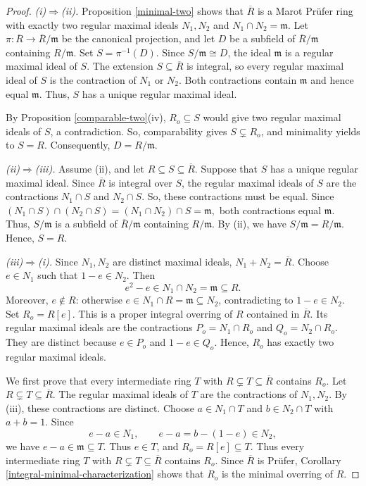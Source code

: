 \documentclass[12pt]{article}
\begin{document}
	\begin{proof}
		\emph{(i)$\Rightarrow$(ii).}
		Proposition \ref{minimal-two} shows that $\overline R$ is a Marot Prüfer ring with exactly two regular maximal ideals $N_1,N_2$ and $N_1\cap N_2=\mathfrak{m}$. Let $\pi:\overline R\to\overline R/\mathfrak{m}$ be the canonical projection, and let $D$ be a subfield of $\overline R/\mathfrak{m}$ containing $R/\mathfrak{m}$. Set $S=\pi^{-1}(D)$. Since $S/\mathfrak{m}\cong D$, the ideal $\mathfrak{m}$ is a regular maximal ideal of $S$. The extension $S\subseteq\overline R$ is integral, so every regular maximal ideal of $S$ is the contraction of $N_1$ or $N_2$. Both contractions contain $\mathfrak{m}$ and hence equal $\mathfrak{m}$. Thus, $S$ has a unique regular maximal ideal.
		
		By Proposition \ref{comparable-two}(iv), $R_o\subseteq S$ would give two regular maximal ideals of $S$, a contradiction. So, comparability gives $S\subsetneq R_o$, and minimality yields to $S=R$. Consequently, $D=R/\mathfrak{m}$.
		
		\emph{(ii)$\Rightarrow$(iii).} Assume (ii), and let $R\subseteq S\subseteq\overline R$. Suppose that $S$ has a unique regular maximal ideal. Since $\overline R$ is integral over $S$, the regular maximal ideals of $S$ are the contractions $N_1\cap S$ and $N_2\cap S$. So, these contractions must be equal. Since $ (N_1\cap S)\cap(N_2\cap S) =(N_1\cap N_2)\cap S=\mathfrak{m}, $ both contractions equal $\mathfrak{m}$. Thus, $S/\mathfrak{m}$ is a subfield of $\overline R/\mathfrak{m}$ containing $R/\mathfrak{m}$. By (ii), we have $S/\mathfrak{m}=R/\mathfrak{m}$. Hence, $S=R$.
		
		\emph{(iii)$\Rightarrow$(i).}
		Since $N_1,N_2$ are distinct maximal ideals, $N_1+N_2=\overline R$. Choose $e\in N_1$ such that $1-e\in N_2$. Then
		\[
		e^2-e\in N_1\cap N_2=\mathfrak{m}\subseteq R.
		\]
		Moreover, $e\notin R$: otherwise $e\in N_1\cap R=\mathfrak{m}\subseteq N_2$, contradicting to $1-e\in N_2$. Set $R_o=R[e]$. This is a proper integral overring of $R$ contained in $\overline R$. Its regular maximal ideals are the contractions $P_o=N_1\cap R_o$ and $Q_o=N_2\cap R_o$. They are distinct because $e\in P_o$ and $1-e\in Q_o$. Hence, $R_o$ has exactly two regular maximal ideals.
		
		We first prove that every intermediate ring $T$ with $R\subsetneq T\subseteq\overline R$ contains $R_o$. Let $R\subsetneq T\subseteq\overline R$. The regular maximal ideals of $T$ are the contractions of $N_1,N_2$. By (iii), these contractions are distinct. Choose $a\in N_1\cap T$ and $b\in N_2\cap T$ with $a+b=1$. Since
		\[
		e-a\in N_1,\qquad e-a=b-(1-e)\in N_2,
		\]
		we have $e-a\in\mathfrak{m}\subseteq T$. Thus $e\in T$, and $R_o=R[e]\subseteq T$. Thus every intermediate ring $T$ with $R\subsetneq T\subseteq\overline R$ contains $R_o$. Since $\overline R$ is Prüfer, Corollary \ref{integral-minimal-characterization} shows that $R_o$ is the minimal overring of $R$.
    \end{proof}
\end{document}
